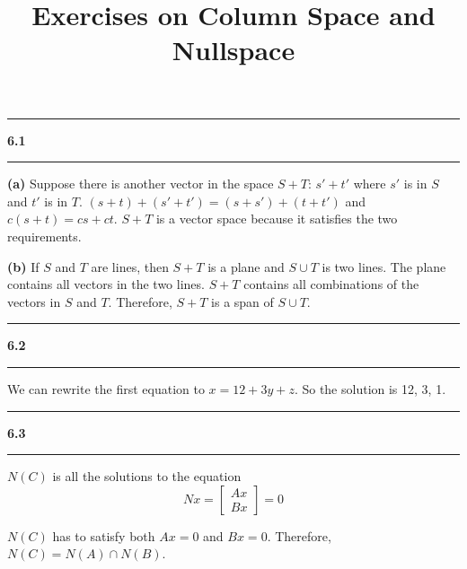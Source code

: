 \documentclass[11pt]{article}
\newcommand\question[2]{\vspace{.25in}\hrule\textbf{#1 #2}\vspace{.5em}\hrule\vspace{.10in}}
\renewcommand\part[1]{\vspace{.10in}\textbf{(#1)}}
\begin{document}
\raggedright
\newcommand\NAME{Haiying Cui}  %
\newcommand\ANDREWID{Christy}     %
\newcommand\HWNUM{6}              %

\title{Exercises on Column Space and Nullspace}
\maketitle

\question{6.1}{}
\part{a} Suppose there is another vector in the space \(S + T\): \(s' + t'\) where \(s'\) is in \(S\) and \(t'\) is in \(T\). 
\((s + t) + (s' + t') = (s + s') + (t + t')\) and \(c(s + t) = cs + ct\). \(S + T\) is a vector space because it satisfies the two requirements.

\part{b} If \(S\) and \(T\) are lines, then \(S + T\) is a plane and \(S \cup T\) is two lines. The plane contains all vectors in the two lines. \(S + T\) contains all combinations of the vectors in \(S\) and \(T\). Therefore, \(S + T\) is a span of \(S \cup T\).

\question{6.2}{}
We can rewrite the first equation to \(x = 12 +3y + z\). So the solution is 12, 3, 1.

\question{6.3}{} \(N(C)\) is all the solutions to the equation
$$Nx = \begin{bmatrix}Ax \\ Bx \end{bmatrix} = 0$$

\(N(C)\) has to satisfy both \(Ax = 0\) and \(Bx = 0\). Therefore, \(N(C) = N(A) \cap N(B)\).
\end{document}
